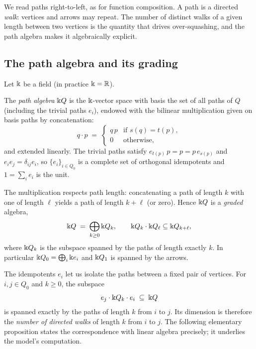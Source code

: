 We read paths right-to-left, as for function composition. A path is a directed
\emph{walk}: vertices and arrows may repeat. The number of distinct walks of a
given length between two vertices is the quantity that drives over-squashing, and
the path algebra makes it algebraically explicit.

\subsection{The path algebra and its grading}

Let $\Bbbk$ be a field (in practice $\Bbbk=\mathbb{R}$).

\begin{definition}
The \emph{path algebra} $\Bbbk Q$ is the $\Bbbk$-vector space with basis the set of all
paths of $Q$ (including the trivial paths $e_i$), endowed with the bilinear
multiplication given on basis paths by concatenation:
\[
  q\cdot p \;=\;
  \begin{cases}
    q\,p & \text{if } s(q)=t(p),\\[2pt]
    0 & \text{otherwise,}
  \end{cases}
\]
and extended linearly. The trivial paths satisfy $e_{t(p)}\,p=p=p\,e_{s(p)}$ and
$e_ie_j=\delta_{ij}e_i$, so $\{e_i\}_{i\in Q_0}$ is a complete set of orthogonal
idempotents and $1=\sum_{i}e_i$ is the unit.
\end{definition}

The multiplication respects path length: concatenating a path of length $k$ with
one of length $\ell$ yields a path of length $k+\ell$ (or zero). Hence $\Bbbk Q$ is a
\emph{graded} algebra,
\[
  \Bbbk Q \;=\; \bigoplus_{k\ge 0}\Bbbk Q_k,
  \qquad \Bbbk Q_k\cdot \Bbbk Q_\ell \subseteq \Bbbk Q_{k+\ell},
\]
where $\Bbbk Q_k$ is the subspace spanned by the paths of length exactly $k$. In
particular $\Bbbk Q_0=\bigoplus_i \Bbbk e_i$ and $\Bbbk Q_1$ is spanned by the arrows.

The idempotents $e_i$ let us isolate the paths between a fixed pair of vertices.
For $i,j\in Q_0$ and $k\ge 0$, the subspace
\[
  e_j\cdot \Bbbk Q_k\cdot e_i \;\subseteq\; \Bbbk Q
\]
is spanned exactly by the paths of length $k$ from $i$ to $j$. Its dimension is
therefore the \emph{number of directed walks} of length $k$ from $i$ to $j$. The
following elementary proposition states the correspondence with linear algebra
precisely; it underlies the model's computation.

